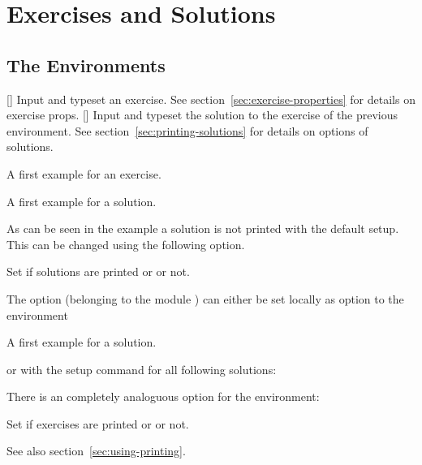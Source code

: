 \documentclass[load-preamble+]{cnltx-doc}
\begin{document}
\section{Exercises and Solutions}

\subsection{The Environments}

\begin{environments}
  []
    Input and typeset an exercise.  See section~\vref{sec:exercise-properties}
    for details on exercise \acsp*{prop}.
  []
    Input and typeset the solution to the exercise of the previous
     environment.  See section~\vref{sec:printing-solutions} for
    details on options of solutions.
\end{environments}

\begin{example}
  \begin{exercise}
    A first example for an exercise.
  \end{exercise}
  \begin{solution}
    A first example for a solution.
  \end{solution}
\end{example}

As can be seen in the example a solution is not printed with the default
setup.  This can be changed using the following option.
\begin{options}
    Set if solutions are printed or or not.
\end{options}

The option (belonging to the module ) can either be set
locally as option to the  environment
\begin{sourcecode}
  \begin{solution}[print=true]
    A first example for a solution.
  \end{solution}
\end{sourcecode}
or with the setup command for all following solutions:
\begin{sourcecode}
\end{sourcecode}

There is an completely analoguous option for the  environment:
\begin{options}
    Set if exercises are printed or or not.
\end{options}
See also section~\vref{sec:using-printing}.
\end{document}
